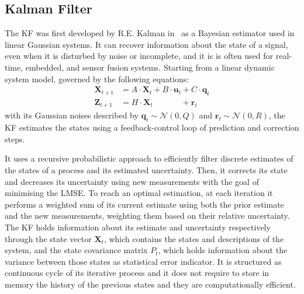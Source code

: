 \subsection{Kalman Filter}

\noindent The \gls{KF} was first developed by R.E. Kalman in~\cite{kalman} as a Bayesian estimator used in linear Gaussian systems.
It can recover information about the state of a signal, even when it is disturbed by noise or incomplete, and it is is often used for real-time, embedded, and sensor fusion systems.
Starting from a linear dynamic system model, governed by the following equations:
\begin{align}
 \label{eq:dyn-mod-s}
    \mathbf{X}_{t+1} & = A \cdot \mathbf{X}_t + B \cdot \mathbf{u}_t  + C \cdot \mathbf{q}_t \\
 \label{eq:dyn-mod-m}
    \mathbf{Z}_{t+1} & = H \cdot \mathbf{X}_t \qquad \quad ~~ + \mathbf{r}_t 
\end{align}
with its Gaussian noises described by $\mathbf{q}_t \sim \mathcal{N}\left(0, Q\right)$ and $\mathbf{r}_t \sim \mathcal{N}\left(0, R\right)$, the \gls{KF} estimates the states using a feedback-control loop of prediction and correction steps.

It uses a recursive probabilistic approach to efficiently filter discrete estimates of the states of a process and its estimated uncertainty.
Then, it corrects its state and decreases its uncertainty using new measurements with the goal of minimising the \gls{LMSE}.
To reach an optimal estimation, at each iteration it performs a weighted sum of its current estimate using both the prior estimate and the new measurements, weighting them based on their relative uncertainty.
The \gls{KF} holds information about its estimate and uncertainty respectively through the state vector $\mathbf{X}_t$, which contains the states and descriptions of the system, and the state covariance matrix $P_t$,  which holds information about the variance between those states as statistical error indicator.
It is structured as continuous cycle of its iterative process and it does not require to store in memory the history of the previous states and they are computationally efficient.

